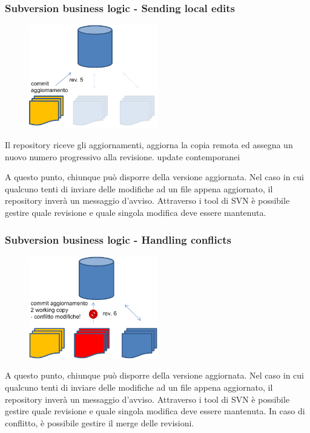 \documentclass[10pt]{beamer}
\begin{document}
\begin{frame}[fragile]
\frametitle{Subversion business logic - Sending local edits}
\begin{figure}[h]
 \centering
 \includegraphics[width=0.5\textwidth]{images/svn-step2.png}
\end{figure}
Il repository riceve gli aggiornamenti, aggiorna la copia remota ed assegna un nuovo numero progressivo alla revisione.
update contemporanei

A questo punto, chiunque può disporre della versione aggiornata. Nel caso in cui qualcuno tenti di inviare delle modifiche ad un file appena aggiornato, il repository inverà un messaggio d’avviso.
Attraverso i tool di SVN è possibile gestire quale revisione e quale singola modifica deve essere mantenuta.
\end{frame}


\begin{frame}[fragile]
\frametitle{Subversion business logic - Handling conflicts}
\begin{figure}[h]
 \centering
 \includegraphics[width=0.5\textwidth]{images/svn-step3.png}
\end{figure}
A questo punto, chiunque può disporre della versione aggiornata. Nel caso in cui qualcuno tenti di inviare delle modifiche ad un file appena aggiornato, il repository inverà un messaggio d’avviso.
Attraverso i tool di SVN è possibile gestire quale revisione e quale singola modifica deve essere mantenuta.
In caso di conflitto, è possibile gestire il merge delle revisioni.
\end{frame}
\end{document}
